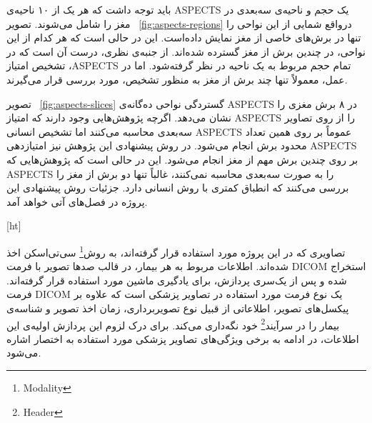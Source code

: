 باید توجه داشت که هر یک از ۱۰ ناحیه‌ی ASPECTS یک حجم و ناحیه‌ی سه‌بعدی در مغز را شامل می‌شوند.
تصویر ~\ref{fig:aspects-regions} درواقع شمایی از این نواحی را تنها در برش‌های خاصی از مغز نمایش داده‌است.
این در حالی است که هر کدام از این نواحی، در چندین برش از مغز گسترده شده‌اند.
از جنبه‌ی نظری، درست آن است که در تشخیص امتیاز ،ASPECTS تمام حجم مربوط به یک ناحیه در نظر گرفته‌شود.
اما در عمل، معمولاً تنها چند برش از مغز به منظور تشخیص، مورد بررسی قرار می‌گیرند.


تصویر ~\ref{fig:aspects-slices}
گستردگی نواحی ده‌گانه‌ی ASPECTS در ۸ برش مغزی را نشان می‌دهد.
اگرچه پژوهش‌هایی وجود دارند که امتیاز ASPECTS را از روی تصاویر سه‌بعدی محاسبه می‌کنند اما تشخیص انسانی ASPECTS عموماً بر روی همین تعداد محدود برش انجام می‌شود.
در روش پیشنهادی این پژوهش نیز امتیازدهی ASPECTS بر روی چندین برش مهم از مغز انجام می‌شود.
این در حالی است که
پژوهش‌هایی که ASPECTS را به صورت سه‌بعدی محاسبه نمی‌کنند، غالباً تنها دو برش از مغز را بررسی می‌کنند
که انطباق کمتری با روش انسانی دارد.
جزئیات روش پیشنهادی این پروژه در فصل‌های آتی خواهد آمد.


[ht]


تصاویری که در این پروژه مورد استفاده قرار گرفته‌اند، به روش\footnote{Modality}
سی‌تی‌اسکن اخذ شده‌اند.
اطلاعات مربوط به هر بیمار، در قالب صدها تصویر با فرمت DICOM استخراج شده و پس از یک‌سری پردازش، برای یادگیری ماشین مورد استفاده قرار گرفته‌اند.
فرمت DICOM یک نوع فرمت مورد استفاده در تصاویر پزشکی است که علاوه بر پیکسل‌های تصویر، اطلاعاتی از قبیل نوع تصویربرداری، زمان اخذ تصویر و شناسه‌ی بیمار را در 
سرآیند\footnote{Header}
خود نگه‌داری می‌کند.
برای درک لزوم این پردازش اولیه‌ی این اطلاعات، در ادامه به برخی ویژگی‌های تصاویر پزشکی مورد استفاده به اختصار اشاره می‌شود.

